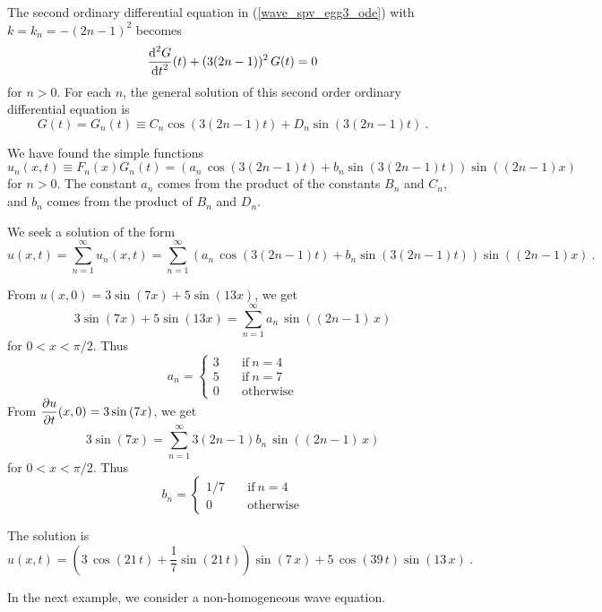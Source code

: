 \begin{egg}
The second ordinary differential equation in (\ref{wave_spv_egg3_ode}) with
$\displaystyle k = k_n = -(2n-1)^2$ becomes
\[
\frac{\displaystyle \mathrm{d}^{2}{G}} {\displaystyle \mathrm{d}{t}^{2}}(t) + (3(2n-1))^2\,G(t) = 0
\]
for $n>0$.  For each $n$, the general solution of this second order
ordinary differential equation is
\[
G(t) = G_n(t) \equiv C_n \cos\left(3(2n-1)t\right)
+ D_n \sin\left(3(2n-1)t\right) \ .
\]

We have found the simple functions
\[
u_n(x,t) \equiv F_n(x)G_n(t) = \left( a_n\,
\cos\left(3(2n-1)t\right) + b_n
\sin\left(3(2n-1)t\right) \right) \sin\left((2n-1)x\right)
\]
for $n>0$.  The constant $a_n$ comes from the product of the constants
$B_n$ and $C_n$, and $b_n$ comes from the product of $B_n$ and $D_n$.

We seek a solution of the form
\[
u(x,t) = \sum_{n=1}^\infty u_n(x,t)
= \sum_{n=1}^\infty \left( a_n\, \cos\left(3(2n-1)t\right) + b_n
\sin\left(3(2n-1)t\right) \right) \sin\left((2n-1)x\right) \ .
\]

From $u(x,0) = 3 \sin\left(7 x\right) + 5 \sin\left(13 x\right)$, we get
\[
3 \sin\left(7 x\right) + 5 \sin\left(13 x\right)
= \sum_{n=1}^\infty a_n\,\sin((2n-1)\,x)
\]
for $0<x<\pi/2$.  Thus
\[
a_n =
\begin{cases}
3 & \quad \text{if} \ n=4 \\
5 & \quad \text{if} \ n=7 \\
0 & \quad \text{otherwise}
\end{cases}
\]
From $\displaystyle \frac{\partial{u}}{\partial t}(x,0) = 3 \sin\left(7 x\right)$, we get
\[
3 \sin\left(7 x\right)
 = \sum_{n=1}^\infty 3(2n-1)b_n\,\sin((2n-1)\,x)
\]
for $0<x<\pi/2$.  Thus
\[
b_n =
\begin{cases}
1/7 & \quad \text{if} \ n=4 \\
0 & \quad \text{otherwise}
\end{cases}
\]

The solution is
\[
u(x,t) = \left( 3\, \cos\left(21\,t\right) + \frac{1}{7}
\sin\left(21\,t\right) \right) \sin\left(7\,x\right)
+5\, \cos\left(39\,t\right) \sin\left(13\,x\right) \ .
\]
\end{egg}

In the next example, we consider a non-homogeneous wave equation.

